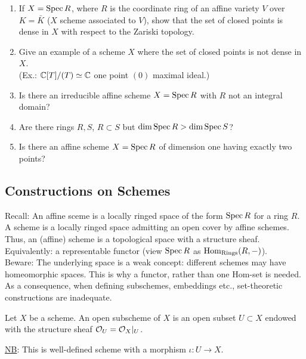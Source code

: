 \documentclass[a4paper,11pt]{article}
\begin{document}
{					\begin{exc}
						\begin{enumerate}
							\item If $X=\operatorname{Spec} R$, where $R$ is the coordinate ring of an affine variety $V$ over $K=\bar{K}$ ($X$ scheme associated to $V$), show that the set of closed points is dense in $X$ with respect to the Zariski topology.
							\item Give an example of a scheme $X$ where the set of closed points is not dense in $X$.\\(Ex.: $\mathbb{C}[T]/(T)\simeq\mathbb{C}$ one point $(0)$ maximal ideal.)
							\item Is there an irreducible affine scheme $X=\operatorname{Spec} R$ with $R$ not an integral domain?
							\item Are there rings $R,S$, $R\subset S$ but $\dim\operatorname{Spec} R>\dim\operatorname{Spec} S$?
							\item Is there an affine scheme $X=\operatorname{Spec} R$ of dimension one having exactly two points?
						\end{enumerate}
					\end{exc}
				
				}


		\subsection{Constructions on Schemes}

			Recall: An affine sceme is a locally ringed space of the form $\operatorname{Spec} R$ for a ring $R$. A scheme is a locally ringed space admitting an open cover by affine schemes. Thus, an (affine) scheme is a topological space with a structure sheaf. Equivalently: a representable functor (view $\operatorname{Spec} R$ as $\operatorname{Hom}_\text{Rings}(R,-)$).
			\\

			Beware: The underlying space is a weak concept: different schemes may have homeomorphic spaces. This is why a functor, rather than one Hom-set is needed. As a consequence, when defining subschemes, embeddings etc., set-theoretic constructions are inadequate.

			\begin{defi}
				Let $X$ be a scheme. An open subscheme of $X$ is an open subset $U\subset X$ endowed with the structure sheaf $\mathcal{O}_U=\mathcal{O}_X|_U$.
			\end{defi}

			\noindent\underline{NB}: This is well-defined scheme with a morphism $\iota:U\rightarrow X$.
			\\
\end{document}
